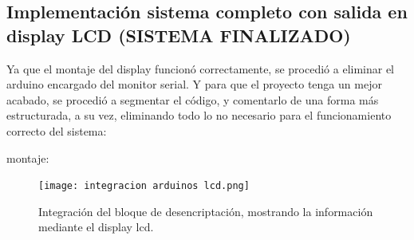 \documentclass{article}
\begin{document}
\newpage
\subsection{Implementación sistema completo con salida en display LCD (SISTEMA FINALIZADO)}\label{intento1}
Ya que el montaje del display funcionó correctamente, se procedió a eliminar el arduino encargado del monitor serial. Y para que el proyecto tenga un mejor acabado, se procedió a segmentar el código, y comentarlo de una forma más estructurada, a su vez, eliminando todo lo no necesario para el funcionamiento correcto del sistema:

montaje:
\begin{figure}[h]
\texttt{[image: integracion arduinos lcd.png]}
\centering
\caption{Integración del bloque de desencriptación, mostrando la información mediante el display lcd.}
\label{fig:lcd}
\end{figure}
\end{document}
